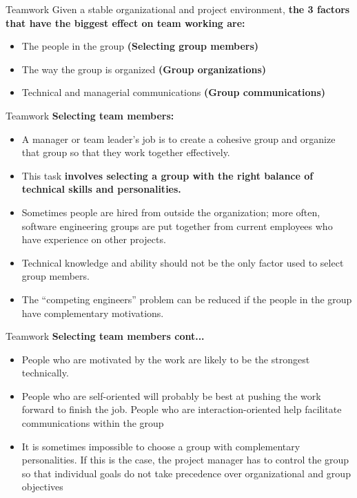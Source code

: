 \documentclass{beamer}
\begin{document}
\begin{frame}{Teamwork}
	Given a stable organizational and project environment,\textbf{ the 3 factors 
		that have the biggest effect on team working are:}
	\begin{itemize}
		\item The people in the group \textbf{(Selecting group members)}
		\item The way the group is organized \textbf{(Group organizations)}
		\item Technical and managerial communications \textbf{(Group communications)}
	\end{itemize}
\end{frame}
\begin{frame}{Teamwork}
\textbf{Selecting team members:}
\begin{itemize}
	\item A manager or team leader’s job is to create a cohesive group and organize that group so that they work 
	together effectively. 
\item This task \textbf{involves selecting a group with the right balance of technical skills and personalities. }
\item Sometimes people are hired from outside the organization; more often, software engineering groups 
	are put together from current employees who have experience on other projects. 
	\item Technical knowledge and ability should not be the only factor used to select group members. 
	\item The “competing engineers” problem can be reduced if the people in the group have complementary 
	motivations. 

\end{itemize}
\end{frame}
\begin{frame}{Teamwork}
	\textbf{Selecting team members cont...}
	\begin{itemize}
	
		\item People who are motivated by the work are likely to be the strongest technically. 
		\item People who are self-oriented will probably be best at pushing the work forward to finish the job. 
		People who are interaction-oriented help facilitate communications within the group
		\item It is sometimes impossible to choose a group with complementary personalities. If this is the case, the 
		project manager has to control the group so that individual goals do not take precedence over 
		organizational and group objectives

	\end{itemize}
\end{frame}
\end{document}
